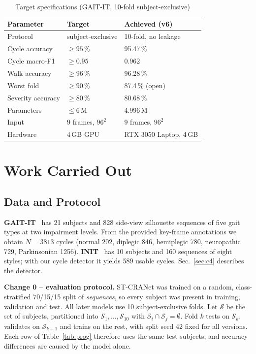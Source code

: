 \documentclass[conference]{IEEEtran}
\begin{document}
\begin{table}[!t]
\centering
\caption{Target specifications (GAIT-IT, 10-fold subject-exclusive)}
\label{tab:spec}
\begin{tabular}{@{}lll@{}}
\toprule
Parameter & Target & Achieved (v6) \\
\midrule
Protocol & subject-exclusive & 10-fold, no leakage \\
Cycle accuracy & $\geq 95\,\%$ & 95.47\,\% \\
Cycle macro-F1 & $\geq 0.95$ & 0.962 \\
Walk accuracy & $\geq 96\,\%$ & 96.28\,\% \\
Worst fold & $\geq 90\,\%$ & 87.4\,\% (open) \\
Severity accuracy & $\geq 80\,\%$ & 80.68\,\% \\
Parameters & $\leq 6$\,M & 4.996\,M \\
Input & 9 frames, $96^2$ & 9 frames, $96^2$ \\
Hardware & 4\,GB GPU & RTX 3050 Laptop, 4\,GB \\
\bottomrule
\end{tabular}
\end{table}

\section{Work Carried Out}
\label{sec:changes}
\subsection{Data and Protocol}
\textbf{GAIT-IT}~\cite{albuquerque2021} has 21 subjects and 828 side-view
silhouette sequences of five gait types at two impairment levels. From the
provided key-frame annotations we obtain $N=3813$ cycles (normal 202, diplegic
846, hemiplegic 780, neuropathic 729, Parkinsonian 1256).
\textbf{INIT}~\cite{ortells2018} has 10 subjects and 160 sequences of eight
styles; with our cycle detector it yields 589 usable cycles. Sec.~\ref{sec:c4}
describes the detector.

\textbf{Change 0 -- evaluation protocol.} ST-CRANet was trained on a random,
class-stratified 70/15/15 split of \emph{sequences}, so every subject was present
in training, validation and test. All later models use 10 subject-exclusive
folds. Let $\mathcal{S}$ be the set of subjects, partitioned into
$\mathcal{S}_1,\dots,\mathcal{S}_{10}$ with
$\mathcal{S}_i\cap\mathcal{S}_j=\emptyset$. Fold $k$ tests on $\mathcal{S}_k$,
validates on $\mathcal{S}_{k+1}$ and trains on the rest, with split seed 42
fixed for all versions. Each row of Table~\ref{tab:prog} therefore uses the
same test subjects, and accuracy differences are caused by the model alone.
\end{document}
